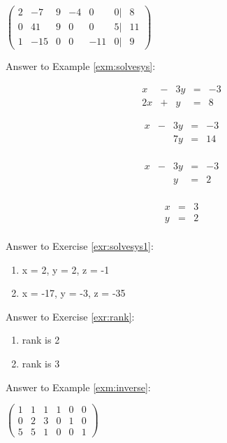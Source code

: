\documentclass[
]{book}
\theoremstyle{definition}
\theoremstyle{definition}
\theoremstyle{definition}
\theoremstyle{remark}
\begin{document}
\(\begin{pmatrix}  2 & -7 & 9 & -4 & 0 & 0| & 8\\  0 & 41 & 9 & 0 & 0 & 5 | & 11\\  1 & -15 & 0 & 0 & -11 & 0 | & 9  \end{pmatrix}\)

Answer to Example \ref{exm:solvesys}:

\[\begin{matrix}
            x  & - & 3y & = & -3\\
            2x & + &  y & = &  8
            \end{matrix}\]

\[\begin{matrix}
            x  & - & 3y & = & -3\\
               &   & 7y & = & 14\\          
            \end{matrix}\]

\[\begin{matrix}
            x  & - & 3y & = & -3\\
               &   & y & = & 2\\            
            \end{matrix}\]

\[\begin{matrix}
            x & = & 3\\
            y & = & 2\\         
            \end{matrix}\]

Answer to Exercise \ref{exr:solvesys1}:

\begin{enumerate}
\def\labelenumi{\arabic{enumi}.}
\item
  x = 2, y = 2, z = -1
\item
  x = -17, y = -3, z = -35
\end{enumerate}

Answer to Exercise \ref{exr:rank}:

\begin{enumerate}
\def\labelenumi{\arabic{enumi}.}
\item
  rank is 2
\item
  rank is 3
\end{enumerate}

Answer to Example \ref{exm:inverse}:

\(\left(\begin{array}{ccc|ccc}  1&1&1&1&0&0\\  0&2&3&0&1&0\\  5&5&1&0&0&1 \end{array} \right)\)
\end{document}
